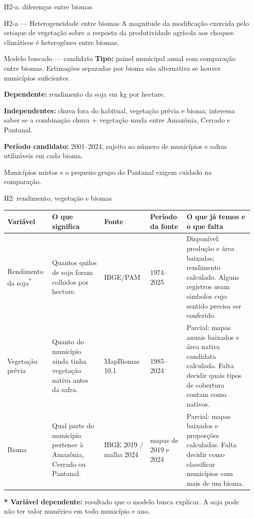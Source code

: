 \documentclass[aspectratio=169,11pt]{beamer}
\newcommand{\fonte}[1]{\par\vfill{\fontsize{7.5}{9}\selectfont\color{gray}#1\par}}
\newcommand{\disp}{\textcolor{azul}{Disponível}}
\newcommand{\parcial}{\textcolor{orange!75!black}{Parcial}}
\begin{document}
\begin{frame}{H2-a: diferenças entre biomas}
\begin{block}{H2-a — Heterogeneidade entre biomas}
A magnitude da modificação exercida pelo estoque de vegetação sobre a resposta da produtividade agrícola aos choques climáticos é heterogênea entre biomas.
\end{block}
\medskip
\begin{block}{Modelo buscado — candidato}
\textbf{Tipo:} painel municipal anual com comparação entre biomas. Estimações separadas por bioma são alternativa se houver municípios suficientes.\par
\textbf{Dependente:} rendimento da soja em kg por hectare.\par
\textbf{Independentes:} chuva fora do habitual, vegetação prévia e bioma; interessa saber se a combinação chuva + vegetação muda entre Amazônia, Cerrado e Pantanal.\par
\textbf{Período candidato:} 2001--2024, sujeito ao número de municípios e safras utilizáveis em cada bioma.
\end{block}
\fonte{Municípios mistos e o pequeno grupo do Pantanal exigem cuidado na comparação.}
\end{frame}

\begin{frame}{H2: rendimento, vegetação e biomas}
\fontsize{9.2}{11.2}\selectfont
\setlength{\tabcolsep}{3pt}
\begin{tabularx}{\textwidth}{P{2.0cm} P{3.25cm} P{1.75cm} P{1.65cm} X}
\toprule
\textbf{Variável} & \textbf{O que significa} & \textbf{Fonte} & \textbf{Período da fonte} & \textbf{O que já temos e o que falta} \\
\midrule
Rendimento da soja\textsuperscript{*} & Quantos quilos de soja foram colhidos por hectare. & IBGE/PAM & 1974--2025 & \disp: produção e área baixadas; rendimento calculado. Alguns registros usam símbolos cujo sentido precisa ser conferido. \\
Vegetação prévia & Quanto do município ainda tinha vegetação nativa antes da safra. & MapBiomas 10.1 & 1985--2024 & \parcial: mapas anuais baixados e área nativa candidata calculada. Falta decidir quais tipos de cobertura contam como nativos. \\
Bioma & Qual parte do município pertence à Amazônia, Cerrado ou Pantanal. & IBGE 2019 / malha 2024 & mapas de 2019 e 2024 & \parcial: mapas baixados e proporções calculadas. Falta decidir como classificar municípios com mais de um bioma. \\
\bottomrule
\end{tabularx}
\medskip
\small\textbf{* Variável dependente:} resultado que o modelo busca explicar. A soja pode não ter valor numérico em todo município e ano.
\end{frame}
\end{document}
